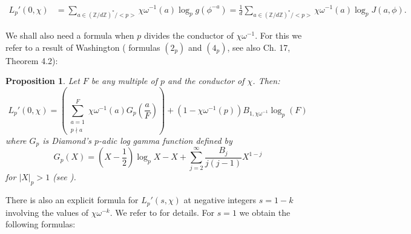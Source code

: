 \documentclass[pdflatex,sn-mathphys-num]{sn-jnl}%
\theoremstyle{plain}
\newtheorem{prop}[thm]{Proposition}
\theoremstyle{definition}
\theoremstyle{remark}
\numberwithin{equation}{section}
\newcommand{\ZZ}{\mathbb{Z}}
\begin{document}
 \begin{align}
  L_p'(0,\chi)  & = \sum_{a \in (\ZZ /d \ZZ)^*/<p> } \chi\omega^{-1}(a) \log_p g(\phi^{-a}) =  \frac{1}{d} \sum_{a \in (\ZZ /d \ZZ)^*/<p> } \chi\omega^{-1}(a)  \log_p J(a, \phi) .
 \label{GrKoForm}
  \end{align}
  
We shall also need a formula when $p$ divides the conductor of $\chi \omega^{-1}$.
For this we refer to a result of Washington (\cite{Wa0} formulas $(2_p)$ and $(4_p)$, see also \cite{lang} Ch. 17, Theorem 4.2):
\begin{prop} Let $F$ be any multiple of $p$ and the conductor of $\chi$. Then:
$$ L_p'(0,\chi) = \left( \sum_{\substack{a=1 \\ p \nmid a}}^F \chi \omega^{-1} (a) G_p \left( \frac{a}{F} \right)  \right) + ( 1 - \chi \omega^{-1} (p) ) B_{1,\chi\omega^{-1}} \log_p (F)$$
where $G_p$ is Diamond's $p$-adic log gamma function defined by
$$G_p (X) = \left(X- \frac{1}{2} \right) \log_p X - X + \sum_{j=2}^{\infty} \frac{B_j}{j(j-1)} X^{1-j} $$
for $|X|_p > 1$ (see \cite{Dia}).
\label{formwash}
\end{prop}
There is also an explicit formula for $L_p'(s,\chi)$ at negative integers $s=1-k$ 
involving the values of $\chi \omega^{-k}$. We refer to \cite{Wa0} for details.
For $s=1$ we obtain the following formulas:
\end{document}
